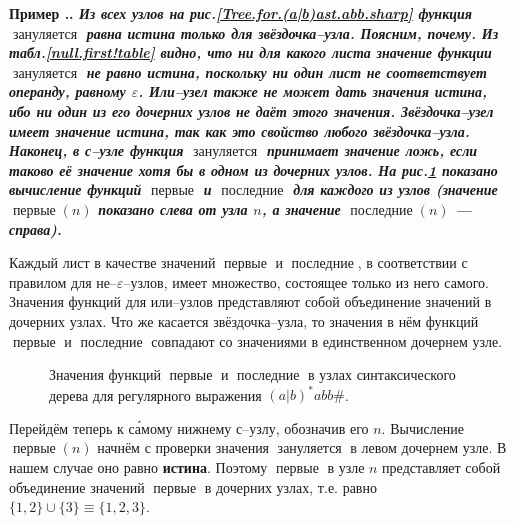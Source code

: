 \documentclass[10pt]{report}
\newcounter{exam}[section]
\renewcommand{\theexam}{\thesection.\arabic{exam}}
\newenvironment{Example}{\par\refstepcounter{exam}\bf Пример \theexam. \sl}{\rm\par}
\newcommand{\nullable}{\mathop{\textit{зануляется}}}
\newcommand{\firstpos}{\mathop{\textit{первые}}}
\newcommand{\lastpos}{\mathop{\textit{последние}}}
\begin{document}
\begin{Example}
Из всех узлов на рис.\ref{Tree.for.(a|b)ast.abb.sharp} функция $\nullable$ равна \textbf{истина} только для звёздочка--узла. Поясним, почему. Из табл.\ref{null.first!table} видно,
что ни для какого листа значение функции $\nullable$ не равно \textbf{истина}, поскольку ни один лист не соответствует операнду, равному $\varepsilon$. Или--узел также не может дать
значения \textbf{истина}, ибо ни один из его дочерних узлов не даёт этого значения. Звёздочка--узел имеет значение \textbf{истина}, так как это свойство любого звёздочка--узла. Наконец, в
с--узле функция $\nullable$ принимает значение \textbf{ложь}, если таково её значение хотя бы в одном из дочерних узлов.
На рис.\ref{first.last!fig} показано вычисление функций $\firstpos$ и $\lastpos$ для каждого из узлов (значение $\firstpos(n)$ показано слева от узла $n$, а значение $\lastpos(n)$ ---
справа).

Каждый лист в качестве значений $\firstpos$ и $\lastpos$, в соответствии с правилом для не--$\varepsilon$--узлов, имеет множество, состоящее только из него самого. Значения функций для
или--узлов представляют собой объединение значений в дочерних узлах. Что же касается звёздочка--узла, то значения в нём функций $\firstpos$ и $\lastpos$ совпадают со значениями в
единственном дочернем узле.\newpage
\begin{figure}[!h]
\centering
{
}
\caption{Значения функций $\firstpos$ и $\lastpos$ в узлах синтаксического дерева для регулярного выражения $(a|b)^*abb\#$.}\label{first.last!fig}
\end{figure}

Перейдём теперь к с\'{а}мому нижнему с--узлу, обозначив его $n$. Вычисление $\firstpos(n)$ начнём с проверки значения $\nullable$ в левом дочернем узле. В нашем случае оно равно
\textbf{истина}. Поэтому $\firstpos$ в узле $n$ представляет собой объединение значений $\firstpos$ в дочерних узлах, т.е. равно $\{1,2\}\cup\{3\}\equiv\{1,2,3\}$.
\end{Example}
\end{document}
